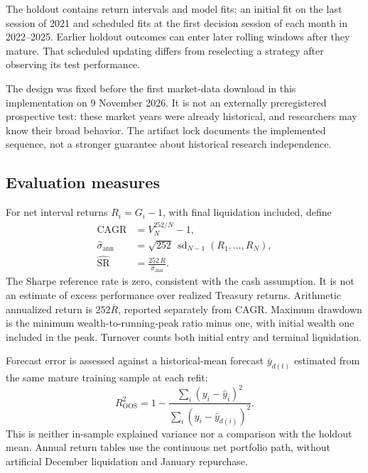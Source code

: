 The holdout contains \OutcomeCount{} return intervals and \FitCount{} model fits: an initial fit on the last session of 2021 and scheduled fits at the first decision session of each month in 2022--2025. Earlier holdout outcomes can enter later rolling windows after they mature. That scheduled updating differs from reselecting a strategy after observing its test performance.

The design was fixed before the first market-data download in this implementation on 9 November 2026. It is not an externally preregistered prospective test: these market years were already historical, and researchers may know their broad behavior. The artifact lock documents the implemented sequence, not a stronger guarantee about historical research independence.

\subsection{Evaluation measures}
For net interval returns $R_i=G_i-1$, with final liquidation included, define
\begin{align}
 \mathrm{CAGR} &= V_N^{252/N}-1,\label{eq:cagr}\\
 \widehat\sigma_{\mathrm{ann}} &= \sqrt{252}\,
 \operatorname{sd}_{N-1}(R_1,\ldots,R_N),\\
 \widehat{\mathrm{SR}} &=
 \frac{252\,\overline R}{\widehat\sigma_{\mathrm{ann}}}.
 \label{eq:sharpe}
\end{align}
The Sharpe reference rate is zero, consistent with the cash assumption. It is not an estimate of excess performance over realized Treasury returns. Arithmetic annualized return is $252\overline R$, reported separately from CAGR. Maximum drawdown is the minimum wealth-to-running-peak ratio minus one, with initial wealth one included in the peak. Turnover counts both initial entry and terminal liquidation.

Forecast error is assessed against a historical-mean forecast $\bar y_{d(t)}$ estimated from the same mature training sample at each refit:
\begin{equation}
 R^2_{\mathrm{OOS}}=1-
 \frac{\sum_i(y_i-\widehat y_i)^2}
 {\sum_i(y_i-\bar y_{d(i)})^2}.
 \label{eq:r2}
\end{equation}
This is neither in-sample explained variance nor a comparison with the holdout mean. Annual return tables use the continuous net portfolio path, without artificial December liquidation and January repurchase.

